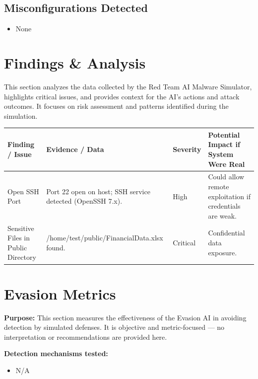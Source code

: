 \documentclass[a4paper,12pt]{article}
\begin{document}
\subsection*{Misconfigurations Detected}
\begin{itemize}
    
        \item None
    
\end{itemize}

\newpage


\section*{Findings \& Analysis}

This section analyzes the data collected by the Red Team AI Malware Simulator, highlights critical issues, and provides context for the AI’s actions and attack outcomes. It focuses on risk assessment and patterns identified during the simulation.

\begin{longtable}{|p{4cm}|p{6cm}|p{2cm}|p{3cm}|}
\hline
\textbf{Finding / Issue} & \textbf{Evidence / Data} & \textbf{Severity} & \textbf{Potential Impact if System Were Real} \\
\hline

Open SSH Port & Port 22 open on host; SSH service detected (OpenSSH 7.x). & High & Could allow remote exploitation if credentials are weak. \\
\hline

Sensitive Files in Public Directory & /home/test/public/FinancialData.xlsx found. & Critical & Confidential data exposure. \\
\hline

\end{longtable}

\newpage


\section*{Evasion Metrics}

\textbf{Purpose:} This section measures the effectiveness of the Evasion AI in avoiding detection by simulated defenses. It is objective and metric-focused — no interpretation or recommendations are provided here.

\vspace{0.3cm}
\textbf{Detection mechanisms tested:}
\begin{itemize}
    
        \item N/A
    
\end{itemize}
\end{document}
